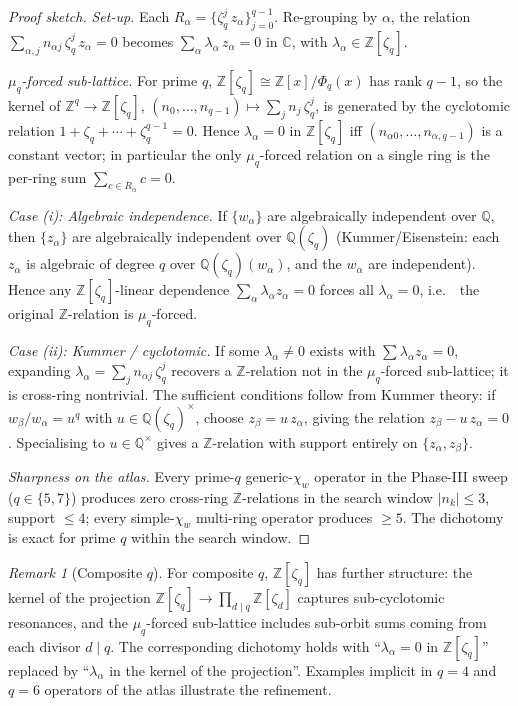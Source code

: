 \documentclass[11pt,a4paper]{article}
\theoremstyle{plain}
\theoremstyle{definition}
\theoremstyle{remark}
\newtheorem{remark}[theorem]{Remark}
\newcommand{\ie}{i.e.\ }
\newcommand{\Zlc}{\mathbb{Z}[\zeta_q]}
\newcommand{\Qlc}{\mathbb{Q}(\zeta_q)}
\begin{document}
\begin{proof}[Proof sketch]
\textit{Set-up.} Each $R_\alpha = \{\zeta_q^j\, z_\alpha\}_{j=0}^{q-1}$.
Re-grouping by $\alpha$, the relation $\sum_{\alpha, j} n_{\alpha j}\,
\zeta_q^j\, z_\alpha = 0$ becomes $\sum_\alpha \lambda_\alpha\, z_\alpha
= 0$ in $\mathbb{C}$, with $\lambda_\alpha \in \Zlc$.

\textit{$\mu_q$-forced sub-lattice.} For prime $q$, $\Zlc \cong \mathbb{Z}[x]
/ \Phi_q(x)$ has rank $q - 1$, so the kernel of $\mathbb{Z}^q \to \Zlc$,
$(n_0, \dots, n_{q-1}) \mapsto \sum_j n_j\, \zeta_q^j$, is generated by
the cyclotomic relation $1 + \zeta_q + \cdots + \zeta_q^{q-1} = 0$. Hence
$\lambda_\alpha = 0$ in $\Zlc$ iff $(n_{\alpha 0}, \dots, n_{\alpha, q-1})$
is a constant vector; in particular the only $\mu_q$-forced relation on a
single ring is the per-ring sum $\sum_{c \in R_\alpha} c = 0$.

\textit{Case (i): Algebraic independence.} If $\{w_\alpha\}$ are
algebraically independent over $\mathbb{Q}$, then $\{z_\alpha\}$ are
algebraically independent over $\Qlc$ (Kummer/Eisenstein: each $z_\alpha$
is algebraic of degree $q$ over $\Qlc(w_\alpha)$, and the $w_\alpha$ are
independent). Hence any $\Zlc$-linear dependence $\sum_\alpha \lambda_\alpha
z_\alpha = 0$ forces all $\lambda_\alpha = 0$, \ie\ the original
$\mathbb{Z}$-relation is $\mu_q$-forced.

\textit{Case (ii): Kummer / cyclotomic.} If some $\lambda_\alpha \ne 0$
exists with $\sum \lambda_\alpha z_\alpha = 0$, expanding $\lambda_\alpha
= \sum_j n_{\alpha j}\, \zeta_q^j$ recovers a $\mathbb{Z}$-relation not in
the $\mu_q$-forced sub-lattice; it is cross-ring nontrivial. The
sufficient conditions follow from Kummer theory: if $w_\beta / w_\alpha
= u^q$ with $u \in \Qlc^\times$, choose $z_\beta = u\, z_\alpha$, giving
the relation $z_\beta - u\, z_\alpha = 0$. Specialising to $u \in
\mathbb{Q}^\times$ gives a $\mathbb{Z}$-relation with support entirely on
$\{z_\alpha, z_\beta\}$.

\textit{Sharpness on the atlas.} Every prime-$q$ generic-$\chi_w$ operator
in the Phase-III sweep ($q \in \{5, 7\}$) produces zero cross-ring
$\mathbb{Z}$-relations in the search window $|n_k| \le 3$, support
$\le 4$; every simple-$\chi_w$ multi-ring operator produces $\ge 5$. The
dichotomy is exact for prime $q$ within the search window.
\end{proof}

\begin{remark}[Composite $q$]\label{rem:D2-composite}
For composite $q$, $\Zlc$ has further structure: the kernel of the
projection $\Zlc \to \prod_{d \mid q} \mathbb{Z}[\zeta_d]$ captures
sub-cyclotomic resonances, and the $\mu_q$-forced sub-lattice includes
sub-orbit sums coming from each divisor $d \mid q$. The corresponding
dichotomy holds with ``$\lambda_\alpha = 0$ in $\Zlc$'' replaced by
``$\lambda_\alpha$ in the kernel of the projection''. Examples implicit
in $q = 4$ and $q = 6$ operators of the atlas illustrate the refinement.
\end{remark}
\end{document}
